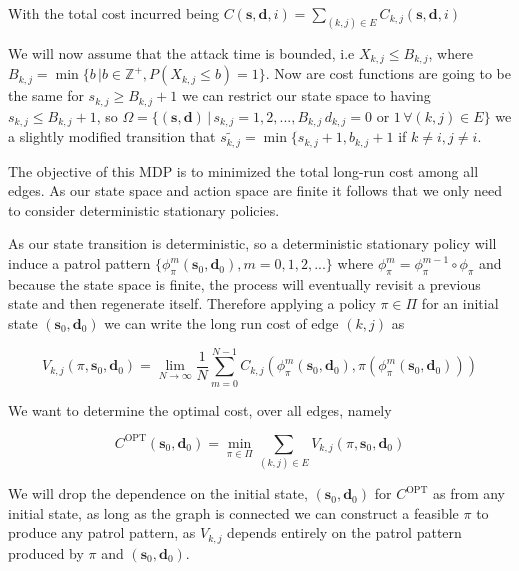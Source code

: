 \documentclass[a4paper,10pt]{article}
\theoremstyle{definition}
\theoremstyle{definition}
\theoremstyle{remark}
\theoremstyle{definition}
\begin{document}
With the total cost incurred being $C(\bm{s},\bm{d},i)=\sum\limits_{(k,j) \in E} C_{k,j}(\bm{s},\bm{d},i)$

We will now assume that the attack time is bounded, i.e $X_{k,j} \leq B_{k,j}$, where $B_{k,j}=\min \{ b \, | b \in \mathbb{Z}^{+} , P(X_{k,j} \leq b)=1 \}$. Now are cost functions are going to be the same for $s_{k,j} \geq B_{k,j}+1$ we can restrict our state space to having $s_{k,j} \leq B_{k,j}+1$, so $\Omega= \{(\bm{s},\bm{d}) \, | \, s_{k,j}=1,2,...,B_{k,j} \, d_{k,j}=0 \text{ or } 1 \, \forall (k,j) \in E \}$ we a slightly modified transition that $\widetilde{s_{k,j}}=\min \{s_{k,j}+1,b_{k,j}+1$ if $k \neq i,j \neq i$.

The objective of this MDP is to minimized the total long-run cost among all edges. As our state space and action space are finite it follows that we only need to consider deterministic stationary policies.

As our state transition is deterministic, so a deterministic stationary policy will induce a patrol pattern $\{ \phi_{\pi}^{m}(\bm{s}_{0},\bm{d}_{0}),m=0,1,2,... \}$ where $\phi_{\pi}^{m}=\phi_{\pi}^{m-1} \circ \phi_{\pi}$ and because the state space is finite, the process will eventually revisit a previous state and then regenerate itself. Therefore applying a policy $\pi \in \Pi$ for an initial state $(\bm{s}_{0},\bm{d}_{0})$ we can write the long run cost of edge $(k,j)$ as

\begin{equation}
V_{k,j}(\pi,\bm{s}_{0},\bm{d}_{0})=\lim\limits_{N \rightarrow \infty} \frac{1}{N} \sum\limits_{m=0}^{N-1} C_{k,j}(\phi_{\pi}^{m}(\bm{s}_{0},\bm{d}_{0}),\pi(\phi_{\pi}^{m}(\bm{s}_{0},\bm{d}_{0})))
\end{equation}

We want to determine the optimal cost, over all edges, namely

\begin{equation}
C^{\text{OPT}}(\bm{s}_{0},\bm{d}_{0})=\min\limits_{\pi \in \Pi} \sum\limits_{(k,j) \in E} V_{k,j}(\pi,\bm{s}_{0},\bm{d}_{0})
\end{equation}

We will drop the dependence on the initial state, $(\bm{s}_{0},\bm{d}_{0})$ for $C^{\text{OPT}}$ as from any initial state, as long as the graph is connected we can construct a feasible $\pi$ to produce any patrol pattern, as $V_{k,j}$ depends entirely on the patrol pattern produced by $\pi$ and $(\bm{s}_{0},\bm{d}_{0})$.
\end{document}
